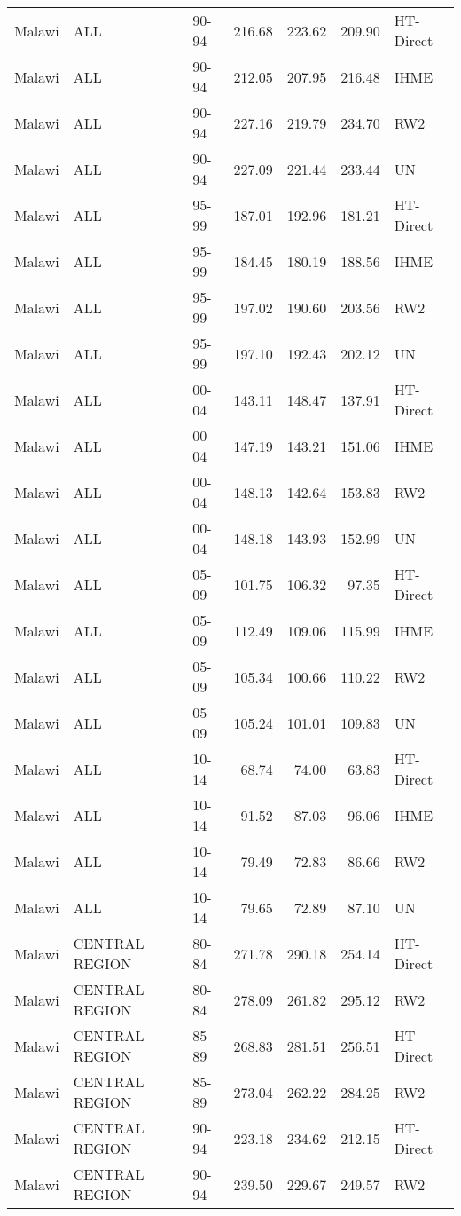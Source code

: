 \begin{longtable}{lllrrrl}
  Malawi & ALL & 90-94 & 216.68 & 223.62 & 209.90 & HT-Direct \\ 
  Malawi & ALL & 90-94 & 212.05 & 207.95 & 216.48 & IHME \\ 
  Malawi & ALL & 90-94 & 227.16 & 219.79 & 234.70 & RW2 \\ 
  Malawi & ALL & 90-94 & 227.09 & 221.44 & 233.44 & UN \\ 
  Malawi & ALL & 95-99 & 187.01 & 192.96 & 181.21 & HT-Direct \\ 
  Malawi & ALL & 95-99 & 184.45 & 180.19 & 188.56 & IHME \\ 
  Malawi & ALL & 95-99 & 197.02 & 190.60 & 203.56 & RW2 \\ 
  Malawi & ALL & 95-99 & 197.10 & 192.43 & 202.12 & UN \\ 
  Malawi & ALL & 00-04 & 143.11 & 148.47 & 137.91 & HT-Direct \\ 
  Malawi & ALL & 00-04 & 147.19 & 143.21 & 151.06 & IHME \\ 
  Malawi & ALL & 00-04 & 148.13 & 142.64 & 153.83 & RW2 \\ 
  Malawi & ALL & 00-04 & 148.18 & 143.93 & 152.99 & UN \\ 
  Malawi & ALL & 05-09 & 101.75 & 106.32 & 97.35 & HT-Direct \\ 
  Malawi & ALL & 05-09 & 112.49 & 109.06 & 115.99 & IHME \\ 
  Malawi & ALL & 05-09 & 105.34 & 100.66 & 110.22 & RW2 \\ 
  Malawi & ALL & 05-09 & 105.24 & 101.01 & 109.83 & UN \\ 
  Malawi & ALL & 10-14 & 68.74 & 74.00 & 63.83 & HT-Direct \\ 
  Malawi & ALL & 10-14 & 91.52 & 87.03 & 96.06 & IHME \\ 
  Malawi & ALL & 10-14 & 79.49 & 72.83 & 86.66 & RW2 \\ 
  Malawi & ALL & 10-14 & 79.65 & 72.89 & 87.10 & UN \\ 
  Malawi & CENTRAL REGION & 80-84 & 271.78 & 290.18 & 254.14 & HT-Direct \\ 
  Malawi & CENTRAL REGION & 80-84 & 278.09 & 261.82 & 295.12 & RW2 \\ 
  Malawi & CENTRAL REGION & 85-89 & 268.83 & 281.51 & 256.51 & HT-Direct \\ 
  Malawi & CENTRAL REGION & 85-89 & 273.04 & 262.22 & 284.25 & RW2 \\ 
  Malawi & CENTRAL REGION & 90-94 & 223.18 & 234.62 & 212.15 & HT-Direct \\ 
  Malawi & CENTRAL REGION & 90-94 & 239.50 & 229.67 & 249.57 & RW2 \\ 

\end{longtable}
